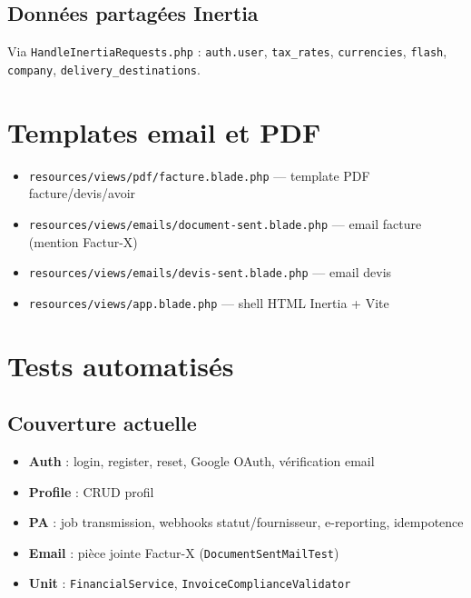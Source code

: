 \documentclass[11pt,a4paper]{report}
\newcommand{\filepath}[1]{\texttt{\small #1}}
\begin{document}
\section{Données partagées Inertia}

Via \filepath{HandleInertiaRequests.php} : \texttt{auth.user}, \texttt{tax\_rates}, \texttt{currencies}, \texttt{flash}, \texttt{company}, \texttt{delivery\_destinations}.

\chapter{Templates email et PDF}

\begin{itemize}[leftmargin=1.5em]
    \item \filepath{resources/views/pdf/facture.blade.php} — template PDF facture/devis/avoir
    \item \filepath{resources/views/emails/document-sent.blade.php} — email facture (mention Factur-X)
    \item \filepath{resources/views/emails/devis-sent.blade.php} — email devis
    \item \filepath{resources/views/app.blade.php} — shell HTML Inertia + Vite
\end{itemize}

\chapter{Tests automatisés}

\section{Couverture actuelle}

\begin{itemize}[leftmargin=1.5em]
    \item \textbf{Auth} : login, register, reset, Google OAuth, vérification email
    \item \textbf{Profile} : CRUD profil
    \item \textbf{PA} : job transmission, webhooks statut/fournisseur, e-reporting, idempotence
    \item \textbf{Email} : pièce jointe Factur-X (\filepath{DocumentSentMailTest})
    \item \textbf{Unit} : \texttt{FinancialService}, \texttt{InvoiceComplianceValidator}
\end{itemize}
\end{document}
